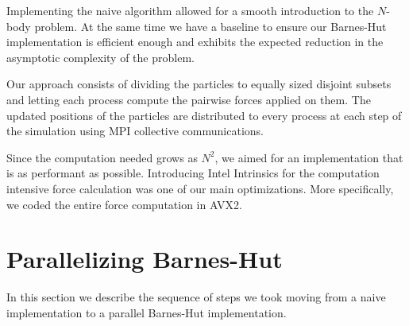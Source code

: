 \documentclass[letterpaper]{article}
\begin{document}
Implementing the naive algorithm allowed for a smooth introduction to the $N$-body problem. At the same time we have a baseline to ensure our Barnes-Hut implementation is efficient enough and exhibits the expected reduction in the asymptotic complexity of the problem.

Our approach consists of dividing the particles to equally sized disjoint subsets and letting each process compute the pairwise forces applied on them. The updated positions of the particles are distributed to every process at each step of the simulation using MPI collective communications.

Since the computation needed grows as $N^2$, we aimed for an implementation that is as performant as possible. Introducing Intel Intrinsics \cite{intel} for the computation intensive force calculation was one of our main optimizations. More specifically, we coded the entire force computation in AVX2.

\section{Parallelizing Barnes-Hut}\label{sec:barneshut}
In this section we describe the sequence of steps we took moving from a naive implementation to a parallel Barnes-Hut implementation.
\end{document}
